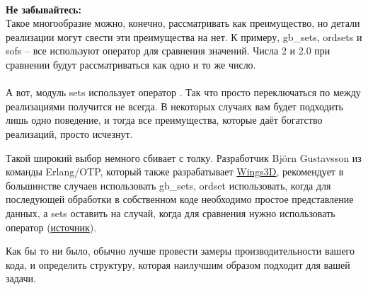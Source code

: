 \\
\colorbox{lorange}
{
    \begin{minipage}{1.0\linewidth}
        \textbf{Не забывайтесь:}\\
        Такое многообразие можно, конечно, рассматривать как преимущество, но детали реализации могут свести эти преимущества на нет.
        К примеру, gb\_sets, ordsets и sofs \--- все используют оператор \ops{==} для сравнения значений.
        Числа 2 и 2.0 при сравнении будут рассматриваться как одно и то же число.\\
        \\
        А вот, модуль sets использует оператор \ops{=:=}.
        Так что просто переключаться по между реализациями получится не всегда.
        В некоторых случаях вам будет подходить лишь одно поведение, и тогда все преимущества, которые даёт богатство реализаций, просто исчезнут.
    \end{minipage}
}

Такой широкий выбор немного сбивает с толку.
Разработчик Bj\"{o}rn Gustavsson из команды Erlang/OTP, который также разрабатывает \href{http://www.wings3d.com/}{Wings3D}, рекомендует в большинстве случаев использовать gb\_sets, ordset использовать, когда для последующей обработки в собственном коде необходимо простое представление данных, а sets оставить на случай, когда для сравнения нужно использовать оператор \ops{=:=} (\href{http://erlang.org/pipermail/erlang-questions/2010-March/050332.html}{источник}).

Как бы то ни было, обычно лучше провести замеры производительности вашего кода, и определить структуру, которая наилучшим образом подходит для вашей задачи.
